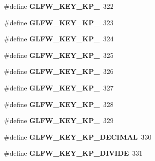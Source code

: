 \begin{DoxyCompactItemize}
\item 
\hypertarget{group__keys_gaf82d5a802ab8213c72653d7480c16f13}{\#define {\bfseries \-G\-L\-F\-W\-\_\-\-K\-E\-Y\-\_\-\-K\-P\-\_}~322}\label{group__keys_gaf82d5a802ab8213c72653d7480c16f13}

\item 
\hypertarget{group__keys_ga7e25ff30d56cd512828c1d4ae8d54ef2}{\#define {\bfseries \-G\-L\-F\-W\-\_\-\-K\-E\-Y\-\_\-\-K\-P\-\_}~323}\label{group__keys_ga7e25ff30d56cd512828c1d4ae8d54ef2}

\item 
\hypertarget{group__keys_gada7ec86778b85e0b4de0beea72234aea}{\#define {\bfseries \-G\-L\-F\-W\-\_\-\-K\-E\-Y\-\_\-\-K\-P\-\_}~324}\label{group__keys_gada7ec86778b85e0b4de0beea72234aea}

\item 
\hypertarget{group__keys_ga9a5be274434866c51738cafbb6d26b45}{\#define {\bfseries \-G\-L\-F\-W\-\_\-\-K\-E\-Y\-\_\-\-K\-P\-\_}~325}\label{group__keys_ga9a5be274434866c51738cafbb6d26b45}

\item 
\hypertarget{group__keys_gafc141b0f8450519084c01092a3157faa}{\#define {\bfseries \-G\-L\-F\-W\-\_\-\-K\-E\-Y\-\_\-\-K\-P\-\_}~326}\label{group__keys_gafc141b0f8450519084c01092a3157faa}

\item 
\hypertarget{group__keys_ga8882f411f05d04ec77a9563974bbfa53}{\#define {\bfseries \-G\-L\-F\-W\-\_\-\-K\-E\-Y\-\_\-\-K\-P\-\_}~327}\label{group__keys_ga8882f411f05d04ec77a9563974bbfa53}

\item 
\hypertarget{group__keys_gab2ea2e6a12f89d315045af520ac78cec}{\#define {\bfseries \-G\-L\-F\-W\-\_\-\-K\-E\-Y\-\_\-\-K\-P\-\_}~328}\label{group__keys_gab2ea2e6a12f89d315045af520ac78cec}

\item 
\hypertarget{group__keys_gafb21426b630ed4fcc084868699ba74c1}{\#define {\bfseries \-G\-L\-F\-W\-\_\-\-K\-E\-Y\-\_\-\-K\-P\-\_}~329}\label{group__keys_gafb21426b630ed4fcc084868699ba74c1}

\item 
\hypertarget{group__keys_ga4e231d968796331a9ea0dbfb98d4005b}{\#define {\bfseries \-G\-L\-F\-W\-\_\-\-K\-E\-Y\-\_\-\-K\-P\-\_\-\-D\-E\-C\-I\-M\-A\-L}~330}\label{group__keys_ga4e231d968796331a9ea0dbfb98d4005b}

\item 
\hypertarget{group__keys_gabca1733780a273d549129ad0f250d1e5}{\#define {\bfseries \-G\-L\-F\-W\-\_\-\-K\-E\-Y\-\_\-\-K\-P\-\_\-\-D\-I\-V\-I\-D\-E}~331}\label{group__keys_gabca1733780a273d549129ad0f250d1e5}


\end{DoxyCompactItemize}

